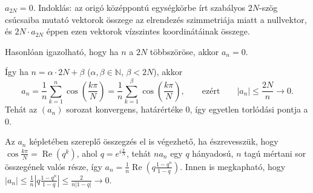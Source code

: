 \documentclass[11pt]{scrartcl}
\begin{document}
$a_{2N} = 0$. Indoklás: az origó középpontú egységkörbe írt
szabályos $2N$-szög csúcsaiba mutató vektorok összege az elrendezés
szimmetriája miatt a nullvektor, és $2N \cdot a_{2N}$ éppen ezen vektorok
vízszintes koordinátáinak összege.

Hasonlóan igazolható, hogy ha $n$ a $2N$ többszöröse, akkor $a_n = 0$.

Így ha $n = \alpha \cdot 2N + \beta$ ($\alpha, \beta \in \mathbb{N}$,
$\beta < 2N$), akkor
\[
	a_n
	= \frac{1}{n} \sum_{k = 1}^{n} \cos\left(\frac{k\pi}{N}\right)
	= \frac{1}{n} \sum_{k = 1}^{\beta} \cos\left(\frac{k\pi}{N}\right),
	\qquad \text{ezért} \qquad
	|a_n| \le \frac{2N}{n} \to 0.
\]
Tehát az $(a_n)$ sorozat konvergens, határértéke $0$, így
egyetlen torlódási pontja a $0$.

Az $a_n$ képletében szereplő összegzés el is végezhető, ha észrevesszük, hogy
$\cos \frac{k\pi}{N} = \operatorname{Re}(q^k)$, ahol $q = e^{i \frac{\pi}{N}}$,
tehát $n a_n$ egy $q$ hányadosú, $n$ tagú mértani sor összegének valós része,
így
\(
a_n = \frac{1}{n} \operatorname{Re}\left(q \frac{1 - q^n}{1 - q}\right)
\).
Innen is megkapható, hogy
\(
|a_n| \le \frac{1}{n} \left| q \frac{1 - q^n}{1 - q} \right|
\le \frac{2}{n |1 - q|} \to 0
\).
\end{document}
